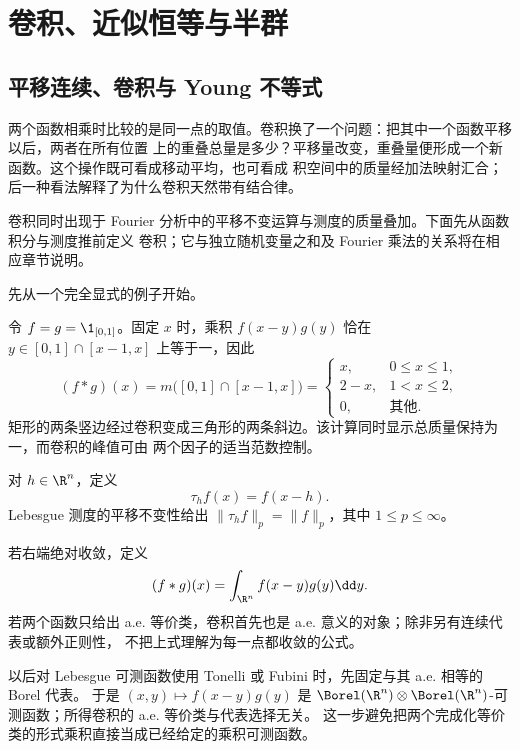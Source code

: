\section{卷积、近似恒等与半群}\label{sec:04-04}

\subsection{平移连续、卷积与 Young 不等式}\label{subsec:4-4-1}

两个函数相乘时比较的是同一点的取值。卷积换了一个问题：把其中一个函数平移以后，两者在所有位置
上的重叠总量是多少？平移量改变，重叠量便形成一个新函数。这个操作既可看成移动平均，也可看成
积空间中的质量经加法映射汇合；后一种看法解释了为什么卷积天然带有结合律。

卷积同时出现于 Fourier 分析中的平移不变运算与测度的质量叠加。下面先从函数积分与测度推前定义
卷积；它与独立随机变量之和及 Fourier 乘法的关系将在相应章节说明。

先从一个完全显式的例子开始。
\begin{example}[两个区间的重叠长度]\label{ex:4-4-1-1}
令 $f=g=\1_{[0,1]}$。固定 $x$ 时，乘积
$f(x-y)g(y)$ 恰在 $y\in[0,1]\cap[x-1,x]$ 上等于一，因此
\begin{equation}\label{eq:indicator-convolution}
 (f*g)(x)=m\bigl([0,1]\cap[x-1,x]\bigr)
 =\begin{cases}
 x,&0\le x\le1,\\
 2-x,&1<x\le2,\\
 0,&\text{其他}.
 \end{cases}
\end{equation}
矩形的两条竖边经过卷积变成三角形的两条斜边。该计算同时显示总质量保持为一，而卷积的峰值可由
两个因子的适当范数控制。
\end{example}

\begin{definition}[平移]\label{def:4-4-1-1}
对 $h\in\R^n$，定义
\[
  \tau_hf(x)=f(x-h).
\]
Lebesgue 测度的平移不变性给出 $\|\tau_hf\|_p=\|f\|_p$，其中
$1\le p\le\infty$。
\end{definition}

\begin{definition}[函数卷积]\label{def:4-4-1-2}
若右端绝对收敛，定义
\[
 (f*g)(x)=\int_{\R^n}f(x-y)g(y)\dd y.
\]
若两个函数只给出 a.e. 等价类，卷积首先也是 a.e. 意义的对象；除非另有连续代表或额外正则性，
不把上式理解为每一点都收敛的公式。
\end{definition}

以后对 Lebesgue 可测函数使用 Tonelli 或 Fubini 时，先固定与其 a.e. 相等的 Borel 代表。
于是 $(x,y)\mapsto f(x-y)g(y)$ 是
$\Borel(\R^n)\otimes\Borel(\R^n)$-可测函数；所得卷积的 a.e. 等价类与代表选择无关。
这一步避免把两个完成化等价类的形式乘积直接当成已经给定的乘积可测函数。

